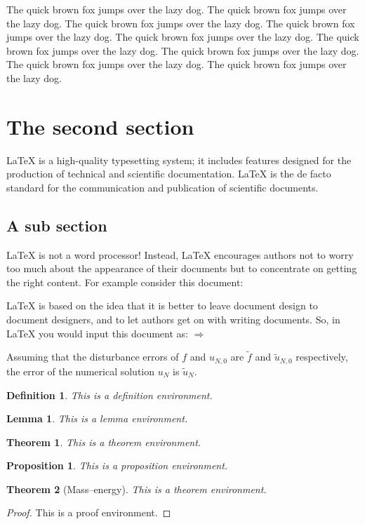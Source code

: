 \documentclass[openany,twoside,12pt]{book}
\theoremstyle{plain}
\newtheorem{definition}{Definition}[chapter]
\newtheorem{proposition}{Proposition}[chapter]
\newtheorem{lemma}{Lemma}[chapter]
\newtheorem{theorem}{Theorem}[chapter]
\numberwithin{equation}{chapter}
\numberwithin{figure}{chapter}
\numberwithin{table}{chapter}
\begin{document}
The quick brown fox jumps over the lazy dog. The quick brown fox jumps over the lazy dog. The quick brown fox jumps over the lazy dog. The quick brown fox jumps over the lazy dog. The quick brown fox jumps over the lazy dog. The quick brown fox jumps over the lazy dog. The quick brown fox jumps over the lazy dog. The quick brown fox jumps over the lazy dog. The quick brown fox jumps over the lazy dog.


\section{The second section}
LaTeX is a high-quality typesetting system; it includes features designed for the production of technical and scientific documentation. LaTeX is the de facto standard for the communication and publication of scientific documents.

\subsection{A sub section}
LaTeX is not a word processor! Instead, LaTeX encourages authors not to worry too much about the appearance of their documents but to concentrate on getting the right content. For example consider this document:

LaTeX is based on the idea that it is better to leave document design to document designers, and to let authors get on with writing documents. So, in LaTeX you would input this document as:
$ \Rightarrow $

Assuming that the disturbance errors of $f$ and $u_{N,0}$ are $\tilde{f}$ and $\tilde{u}_{N,0}$ respectively, the error of the numerical solution $u_N$ is $\tilde{u}_N$.


\begin{definition}
This is a definition environment.
\end{definition}

\begin{lemma}
This is a lemma environment.
\end{lemma}

\begin{theorem}
This is a theorem environment.
\end{theorem}

\begin{proposition}
This is a proposition environment.
\end{proposition}

\begin{theorem}[Mass--energy]
This is a theorem environment.
\end{theorem}
\begin{proof}
  This is a proof environment.
\end{proof}
\end{document}
